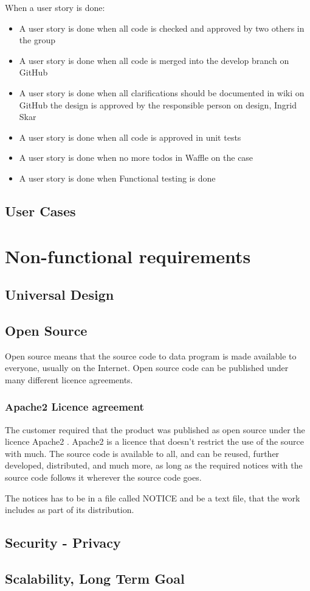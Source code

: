 \begin{description}
    \item[When a user story is done:]
\end{description}
\begin{itemize}[noitemsep]
    \item A user story is done when all code is checked and approved by two others in the group
    \item A user story is done when all code is merged into the develop branch on GitHub
    \item A user story is done when all clarifications should be documented in wiki on GitHub
the design is approved by the responsible person on design, Ingrid Skar
    \item A user story is done when all code is approved in unit tests
    \item A user story is done when no more todos in Waffle on the case
    \item A user story is done when Functional testing is done
\end{itemize}


\subsection{User Cases}
\label{User cases}

\section{Non-functional requirements}
\subsection{Universal Design}
\label{universalDesign}

\subsection{Open Source}
Open source means that the source code to data program is made available to everyone, usually on the Internet. Open source code can be published under many different licence agreements.

\subsubsection{Apache2 Licence agreement}
The customer required that the product was published as open source under the licence Apache2 \cite{apache2}.
Apache2 is a licence that doesn't restrict the use of the source with much. The source code is available to all, and can be reused, further developed, distributed, and much more, as long as the required notices with the source code follows it wherever the source code goes. 

The notices has to be in a file called NOTICE and be a text file, that the work includes as part of its distribution.

\subsection{Security - Privacy}

\subsection{Scalability, Long Term Goal}



\cleardoublepage